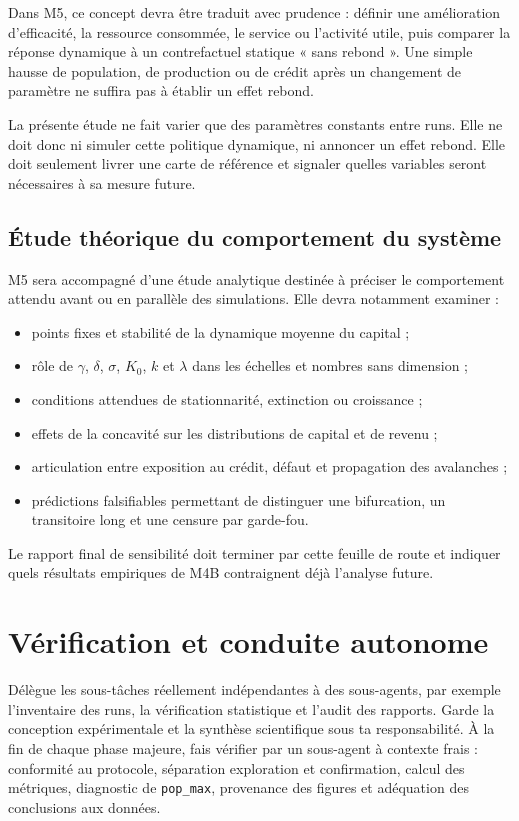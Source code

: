 \documentclass[11pt,a4paper]{article}
\newcommand{\code}[1]{\texttt{\color{navy}#1}}
\begin{document}
Dans M5, ce concept devra être traduit avec prudence : définir une amélioration
d'efficacité, la ressource consommée, le service ou l'activité utile, puis
comparer la réponse dynamique à un contrefactuel statique « sans rebond ». Une
simple hausse de population, de production ou de crédit après un changement de
paramètre ne suffira pas à établir un effet rebond.

La présente étude ne fait varier que des paramètres constants entre runs. Elle
ne doit donc ni simuler cette politique dynamique, ni annoncer un effet rebond.
Elle doit seulement livrer une carte de référence et signaler quelles variables
seront nécessaires à sa mesure future.

\subsection{Étude théorique du comportement du système}

M5 sera accompagné d'une étude analytique destinée à préciser le comportement
attendu avant ou en parallèle des simulations. Elle devra notamment examiner :

\begin{itemize}
  \item points fixes et stabilité de la dynamique moyenne du capital ;
  \item rôle de $\gamma$, $\delta$, $\sigma$, $K_0$, $k$ et $\lambda$ dans les
    échelles et nombres sans dimension ;
  \item conditions attendues de stationnarité, extinction ou croissance ;
  \item effets de la concavité sur les distributions de capital et de revenu ;
  \item articulation entre exposition au crédit, défaut et propagation des
    avalanches ;
  \item prédictions falsifiables permettant de distinguer une bifurcation, un
    transitoire long et une censure par garde-fou.
\end{itemize}

Le rapport final de sensibilité doit terminer par cette feuille de route et
indiquer quels résultats empiriques de M4B contraignent déjà l'analyse future.

\section{Vérification et conduite autonome}

Délègue les sous-tâches réellement indépendantes à des sous-agents, par exemple
l'inventaire des runs, la vérification statistique et l'audit des rapports.
Garde la conception expérimentale et la synthèse scientifique sous ta
responsabilité. À la fin de chaque phase majeure, fais vérifier par un
sous-agent à contexte frais : conformité au protocole, séparation exploration
et confirmation, calcul des métriques, diagnostic de \code{pop\_max},
provenance des figures et adéquation des conclusions aux données.
\end{document}
